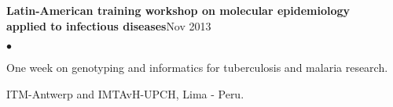 \documentclass[margin,line]{res}
\newenvironment{list2}{
  \begin{list}{$\bullet$}{%
      \setlength{\itemsep}{0in}
      \setlength{\parsep}{0in} \setlength{\parskip}{0in}
      \setlength{\topsep}{0in} \setlength{\partopsep}{0in}
      \setlength{\leftmargin}{0.2in}}}{\end{list}}
\begin{document}
\begin{resume}


{\bf Latin-American training workshop on molecular epidemiology \\applied to infectious diseases}\hfill {Nov 2013}\\
	\vspace*{-.1in}%
\begin{list2} %
	\item One week on genotyping and informatics for tuberculosis and malaria research. %
	\item ITM-Antwerp and IMTAvH-UPCH, Lima - Peru.\\%
\end{list2}



\end{resume}
\end{document}
